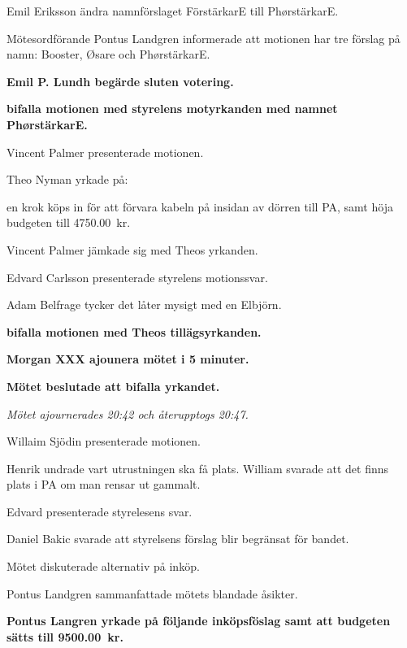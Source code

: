 \documentclass[10pt]{article}
\begin{document}
\begin{paragrafer}
\begin{paragrafer}
      Emil Eriksson \ypa ändra namnförslaget FörstärkarE till PhørstärkarE.

      Mötesordförande Pontus Landgren informerade att motionen har tre förslag på namn: Booster, Øsare och PhørstärkarE.

      \textbf{Emil P. Lundh begärde sluten votering.} 

      \textbf{\Mba bifalla motionen med styrelens motyrkanden med namnet PhørstärkarE.}



      Vincent Palmer presenterade motionen. 

      Theo Nyman yrkade på:
      \begin{attsatser}
        \att en krok köps in för att förvara kabeln på insidan av dörren till PA, samt
        \att höja budgeten till \SI{4750,00}{kr}.
      \end{attsatser} 
      
      Vincent Palmer jämkade sig med Theos yrkanden. 

      Edvard Carlsson presenterade styrelens motionssvar. 

      Adam Belfrage tycker det låter mysigt med en Elbjörn. 

      \textbf{\Mba bifalla motionen med Theos tillägsyrkanden.}

      \textbf{Morgan XXX \ypa ajounera mötet i 5 minuter.}
      
      \textbf{Mötet beslutade att bifalla yrkandet.}
      
      \textit{Mötet ajournerades 20:42 och återupptogs 20:47.}


      Willaim Sjödin presenterade motionen. 

      Henrik undrade vart utrustningen ska få plats. William svarade att det finns plats i PA om man rensar ut gammalt. 

      Edvard presenterade styrelesens svar. 

      Daniel Bakic svarade att styrelsens förslag blir begränsat för bandet. 

      Mötet diskuterade alternativ på inköp.

      Pontus Landgren sammanfattade mötets blandade åsikter.

      \textbf{Pontus Langren yrkade på följande inköpsföslag samt att budgeten sätts till \SI{9500,00}{kr}.}


\end{paragrafer}
\end{paragrafer}
\end{document}
